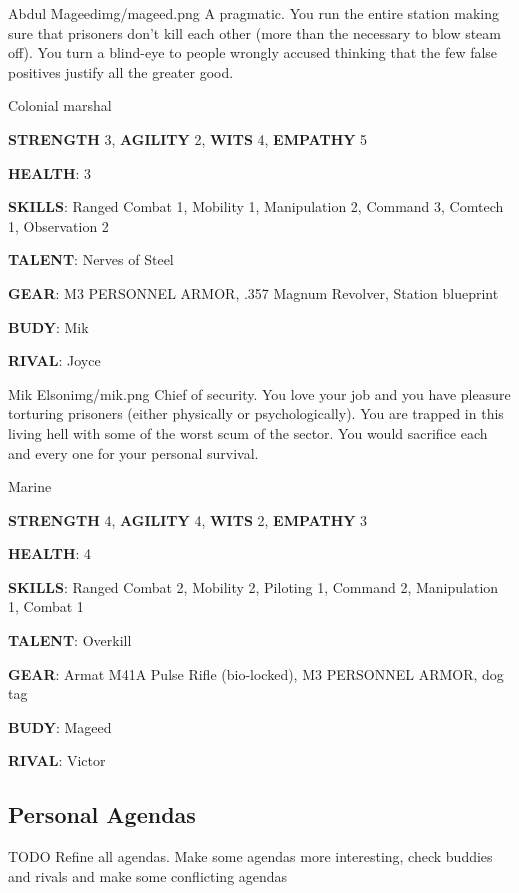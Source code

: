 \newsect

\medskip \medskip \medskip \medskip \medskip \medskip \medskip \medskip


\begin{rpg-pcbox}{Abdul Mageed}{img/mageed.png}
    A pragmatic. You run the entire station making sure that prisoners don't kill each other (more than the necessary to blow steam off). You turn a blind-eye to people wrongly accused thinking that the few false positives justify all the greater good.
\end{rpg-pcbox}

\begin{rpg-commentbox}{}
    Colonial marshal

    \textbf{STRENGTH} 3, \textbf{AGILITY} 2, \textbf{WITS} 4, \textbf{EMPATHY} 5

    \textbf{HEALTH}: 3

    \textbf{SKILLS}: Ranged Combat 1, Mobility 1, Manipulation 2, Command 3, Comtech 1, Observation 2
    
    \textbf{TALENT}: Nerves of Steel
    
    \textbf{GEAR}: M3 PERSONNEL ARMOR, .357 Magnum Revolver, Station blueprint
      
    \textbf{BUDY}: Mik
    
    \textbf{RIVAL}: Joyce
\end{rpg-commentbox}


\newsect

\begin{rpg-pcbox}{Mik Elson}{img/mik.png}
    Chief of security. You love your job and you have pleasure torturing prisoners (either physically or psychologically). You are trapped in this living hell with some of the worst scum of the sector. You would sacrifice each and every one for your personal survival.
\end{rpg-pcbox}

\begin{rpg-commentbox}{}
    Marine

    \textbf{STRENGTH} 4, \textbf{AGILITY} 4, \textbf{WITS} 2, \textbf{EMPATHY} 3

    \textbf{HEALTH}: 4

    \textbf{SKILLS}: Ranged Combat 2, Mobility 2, Piloting 1, Command 2, Manipulation 1, Combat 1
    
    \textbf{TALENT}: Overkill
    
    \textbf{GEAR}: Armat M41A Pulse Rifle (bio-locked), M3 PERSONNEL ARMOR, dog tag

    \textbf{BUDY}: Mageed
    
    \textbf{RIVAL}: Victor
\end{rpg-commentbox}

\newsect


\clearpage

\subsection{Personal Agendas}


\begin{rpg-warnbox}{TODO}
    Refine all agendas. Make some agendas more interesting, check buddies and rivals and make some conflicting agendas
\end{rpg-warnbox}

